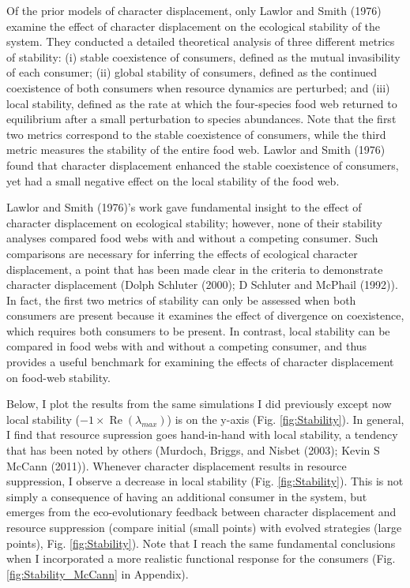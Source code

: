 \documentclass[11pt,]{article}
\begin{document}
Of the prior models of character displacement, only Lawlor and Smith
(1976) examine the effect of character displacement on the ecological
stability of the system. They conducted a detailed theoretical analysis
of three different metrics of stability: (i) stable coexistence of
consumers, defined as the mutual invasibility of each consumer; (ii)
global stability of consumers, defined as the continued coexistence of
both consumers when resource dynamics are perturbed; and (iii) local
stability, defined as the rate at which the four-species food web
returned to equilibrium after a small perturbation to species
abundances. Note that the first two metrics correspond to the stable
coexistence of consumers, while the third metric measures the stability
of the entire food web. Lawlor and Smith (1976) found that character
displacement enhanced the stable coexistence of consumers, yet had a
small negative effect on the local stability of the food web.

Lawlor and Smith (1976)'s work gave fundamental insight to the effect of
character displacement on ecological stability; however, none of their
stability analyses compared food webs with and without a competing
consumer. Such comparisons are necessary for inferring the effects of
ecological character displacement, a point that has been made clear in
the criteria to demonstrate character displacement (Dolph Schluter
(2000); D Schluter and McPhail (1992)). In fact, the first two metrics
of stability can only be assessed when both consumers are present
because it examines the effect of divergence on coexistence, which
requires both consumers to be present. In contrast, local stability can
be compared in food webs with and without a competing consumer, and thus
provides a useful benchmark for examining the effects of character
displacement on food-web stability.

Below, I plot the results from the same simulations I did previously
except now local stability
(\(-1\times\operatorname{Re}(\lambda_{max})\)) is on the y-axis (Fig.
\ref{fig:Stability}). In general, I find that resource supression goes
hand-in-hand with local stability, a tendency that has been noted by
others (Murdoch, Briggs, and Nisbet (2003); Kevin S McCann (2011)).
Whenever character displacement results in resource suppression, I
observe a decrease in local stability (Fig. \ref{fig:Stability}). This
is not simply a consequence of having an additional consumer in the
system, but emerges from the eco-evolutionary feedback between character
displacement and resource suppression (compare initial (small points)
with evolved strategies (large points), Fig. \ref{fig:Stability}). Note
that I reach the same fundamental conclusions when I incorporated a more
realistic functional response for the consumers (Fig.
\ref{fig:Stability_McCann} in Appendix).
\end{document}
